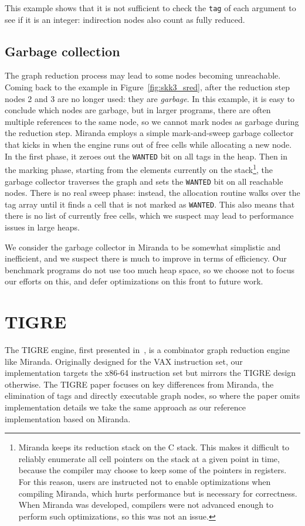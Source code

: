\documentclass[conference]{IEEEtran}
\begin{document}
This example shows that it is not sufficient to check the \texttt{tag} of each argument to see if it is an integer: indirection nodes also count as fully reduced.

\subsection{Garbage collection}
\label{sec:gc}
The graph reduction process may lead to some nodes becoming unreachable.
Coming back to the example in Figure~\ref{fig:skk3_sred}, after the reduction step nodes 2 and 3 are no longer used: they are \textit{garbage}.
In this example, it is easy to conclude which nodes are garbage, but in larger programs, there are often multiple references to the same node, so we cannot mark nodes as garbage during the reduction step.
Miranda employs a simple mark-and-sweep garbage collector that kicks in when the engine runs out of free cells while allocating a new node.
In the first phase, it zeroes out the \texttt{WANTED} bit on all tags in the heap.
Then in the marking phase, starting from the elements currently on the stack\footnote{
    Miranda keeps its reduction stack on the C stack.
    This makes it difficult to reliably enumerate all cell pointers on the stack at a given point in time, because the compiler may choose to keep some of the pointers in registers.
    For this reason, users are instructed not to enable optimizations when compiling Miranda, which hurts performance but is necessary for correctness.
    When Miranda was developed, compilers were not advanced enough to perform such optimizations, so this was not an issue.
}, the garbage collector traverses the graph and sets the \texttt{WANTED} bit on all reachable nodes.
There is no real sweep phase: instead, the allocation routine walks over the tag array until it finds a cell that is not marked as \texttt{WANTED}.
This also means that there is no list of currently free cells, which we suspect may lead to performance issues in large heaps.

We consider the garbage collector in Miranda to be somewhat simplistic and inefficient, and we suspect there is much to improve in terms of efficiency.
Our benchmark programs do not use too much heap space, so we choose not to focus our efforts on this, and defer optimizations on this front to future work.

\section{TIGRE}
\label{sec:tigre}
The TIGRE engine, first presented in~\cite{koopman_fresh_1989}, is a combinator graph reduction engine like Miranda.
Originally designed for the VAX instruction set, our implementation targets the x86-64 instruction set but mirrors the TIGRE design otherwise.
The TIGRE paper focuses on key differences from Miranda, the elimination of tags and directly executable graph nodes, so where the paper omits implementation details we take the same approach as our reference implementation based on Miranda.
\end{document}
